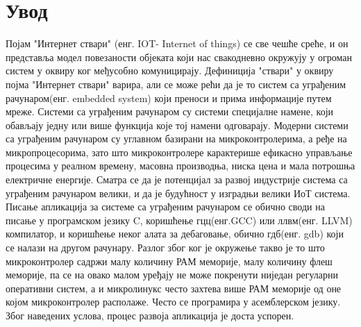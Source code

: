 \documentclass[12pt,oneside]{memoir}
\begin{document}
\frontmatter
\naslovna
\komisija
\apstrakt
\tableofcontents*

\mainmatter

\chapter{Увод}
Појам "Интернет ствари" (енг. IOT- Internet of things) се све чешће среће, и он представља модел повезаности објеката који нас свакодневно окружују у огроман систем у оквиру ког међусобно комуницирају. Дефиниција "ствари" у оквиру појма "Интернет ствари" варира, али се може рећи да је то систем са уграђеним рачунаром(енг. embedded system) који преноси и прима информације путем мреже. Системи са уграђеним рачунаром су системи специјалне намене, који обављају једну или више функција које тој намени одговарају. Модерни системи са уграђеним рачунаром су углавном базирани на микроконтролерима, а ређе на микропроцесорима, зато што микроконтролере карактерише ефикасно управљање процесима у реалном времену, масовна производња, ниска цена и мала потрошња електричне енергије. Сматра се да је потенцијал за развој индустрије система са уграђеним рачунаром велики, и да је будућност у изградњи велики ИоТ система.\\

Писање апликација за системе са уграђеним рачунаром се обично своди на писање у програмском језику C, коришћење гцц(енг.GCC) или ллвм(енг. LLVM) компилатор, и коришћење неког алата за дебаговање, обично гдб(енг. gdb) који се налази на другом рачунару. Разлог због ког је окружење такво је то што микроконтролер садржи малу количину РАМ меморије, малу количину флеш меморије, па се на овако малом уређају не може покренути ниједан регуларни оперативни систем, а и микролинукс често захтева више РАМ меморије од оне којом микроконтролер располаже. Често се програмира у асемблерском језику. Због наведених услова, процес развоја апликација је доста успорен. 
\end{document}
